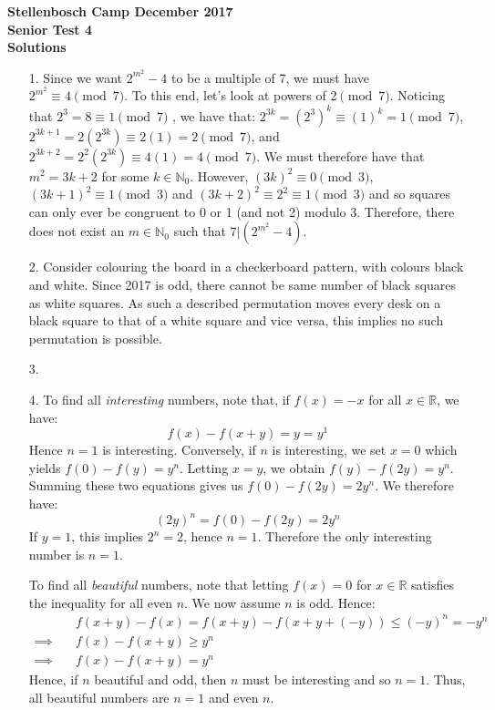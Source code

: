 \documentclass[a4paper, 12pt]{article}
\begin{document}
\begin{center}
\textbf{Stellenbosch Camp December 2017 \\ Senior Test 4} \\
\textbf{Solutions}
\end{center}

\begin{enumerate}

    \item[1.] Since we want $2^{m^2}-4$ to be a multiple of 7, we must have $2^{m^2} \equiv 4 \pmod{7}$. To this end, let's look at powers of 2$\pmod{7}$. Noticing that $2^3=8\equiv 1 \pmod{7}$ , we have that: $2^{3k} = (2^3)^k \equiv (1)^k = 1 \pmod{7}$, $2^{3k+1} = 2(2^{3k}) \equiv 2(1) = 2 \pmod{7}$, and $2^{3k+2} = 2^2(2^{3k}) \equiv 4(1) = 4 \pmod{7}$. We must therefore have that $m^2 = 3k+2$ for some $k\in \mathbb{N}_0$. However, $(3k)^2\equiv 0 \pmod{3}$, $(3k+1)^2\equiv 1 \pmod{3}$ and $(3k+2)^2 \equiv 2^2 \equiv 1 \pmod{3}$ and so squares can only ever be congruent to 0 or 1 (and not 2) modulo 3. Therefore, there does not exist an $m\in \mathbb{N}_0$ such that $7|(2^{m^2}-4)$. 
    
    \item[2.] Consider colouring the board in a checkerboard pattern, with colours black and white. Since 2017 is odd, there cannot be same number of black squares as white squares. As such a described permutation moves every desk on a black square to that of a white square and vice versa, this implies no such permutation is possible.
    
    \item[3.] 
    
    \item[4.] To find all \textit{interesting} numbers, note that, if $f(x) = -x$ for all $x \in \mathbb{R}$, we have:
    $$ f(x) - f(x+y) = y = y^1 $$
    Hence $n=1$ is interesting. Conversely, if $n$ is interesting, we set $x = 0$ which yields $f(0) - f(y) = y^n$. Letting $x = y$, we obtain $f(y) - f(2y) = y^n$. Summing these two equations gives us $f(0) - f(2y) = 2y^n$. We therefore have:
    $$ (2y)^n = f(0) - f(2y) = 2y^n $$
    If $y = 1$, this implies $2^n = 2$, hence $n = 1$. Therefore the only interesting number is $n = 1$.
    
    To find all \textit{beautiful} numbers, note that letting $f(x) = 0$ for $x \in \mathbb{R}$ satisfies the inequality for all even $n$. We now assume $n$ is odd. Hence:
    \begin{align*}
        &f(x+y)-f(x)=f(x+y)-f(x+y+(-y)) \leq (-y)^n=-y^n \\
        \implies \quad &f(x)-f(x+y)\geq y^n \\
        \implies \quad &f(x)-f(x+y)=y^n
    \end{align*}
    Hence, if $n$ beautiful and odd, then $n$ must be interesting and so $n = 1$. Thus, all beautiful numbers are $n = 1$ and even $n$.
    

\end{enumerate}
\end{document}
